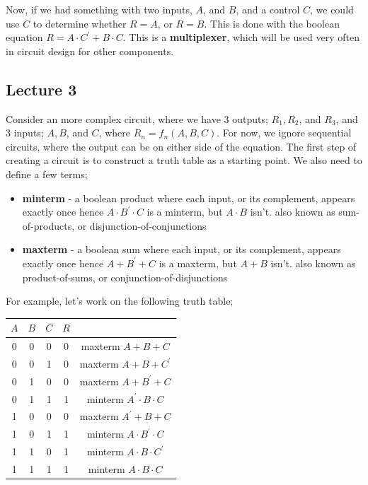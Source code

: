 \documentclass[a4paper, 12pt]{article}
\begin{document}
            Now, if we had something with two inputs, $A$, and $B$, and a control $C$, we could use $C$ to determine whether $R = A$, or $R = B$. This is done with the boolean equation $R = A \cdot C^\prime + B \cdot C$. This is a \textbf{multiplexer}, which will be used very often in circuit design for other components.
        \subsection*{Lecture 3}
            Consider an more complex circuit, where we have 3 outputs; $R_1, R_2$, and $R_3$, and 3 inputs; $A, B$, and $C$, where $R_n=f_n(A, B, C)$. For now, we ignore sequential circuits, where the output can be on either side of the equation. The first step of creating a circuit is to construct a truth table as a starting point. We also need to define a few terms;
            \begin{itemize}
                \itemsep0em
                \item \textbf{minterm} - a boolean product where each input, or its complement, appears exactly once
                    \subitem hence $A \cdot B^\prime \cdot C$ is a minterm, but $A \cdot B$ isn't.
                    \subitem also known as sum-of-products, or disjunction-of-conjunctions
                \item \textbf{maxterm} - a boolean sum where each input, or its complement, appears exactly once
                    \subitem hence $A + B^\prime + C$ is a maxterm, but $A + B$ isn't.
                    \subitem also known as product-of-sums, or conjunction-of-disjunctions
            \end{itemize}
            For example, let's work on the following truth table;
            \begin{center}
                \begin{tabular}{c|c|c|c|c}
                    $A$ & $B$ & $C$ & $R$ & \\
                    \hline
                    0 & 0 & 0 & 0 & maxterm $A + B + C$ \\
                    0 & 0 & 1 & 0 & maxterm $A + B + C^\prime$ \\
                    0 & 1 & 0 & 0 & maxterm $A + B^\prime + C$ \\
                    0 & 1 & 1 & 1 & minterm $A^\prime \cdot B \cdot C$ \\
                    1 & 0 & 0 & 0 & maxterm $A^\prime + B + C$ \\
                    1 & 0 & 1 & 1 & minterm $A \cdot B^\prime \cdot C$ \\
                    1 & 1 & 0 & 1 & minterm $A \cdot B \cdot C^\prime$ \\
                    1 & 1 & 1 & 1 & minterm $A \cdot B \cdot C$
                \end{tabular}
            \end{center}
\end{document}
